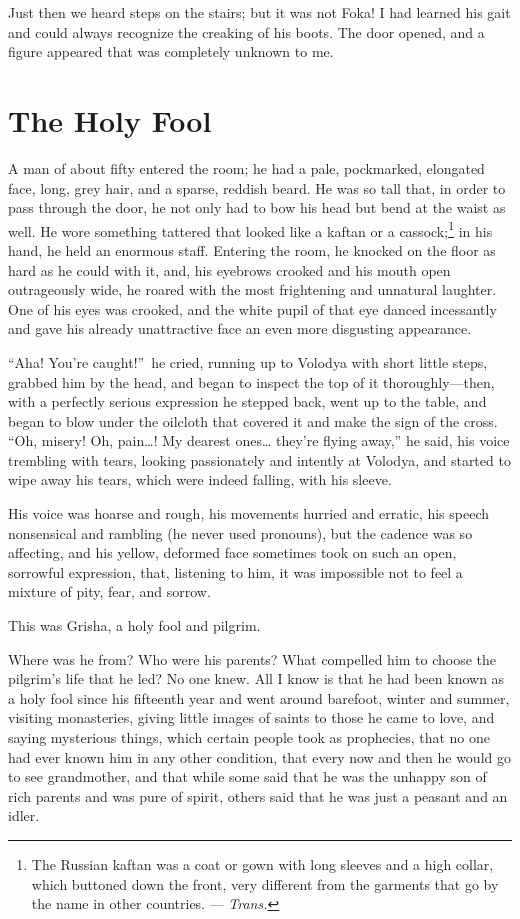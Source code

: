Just then we heard steps on the stairs; but it was not Foka! I had learned his gait and could always recognize the creaking of his boots. The door opened, and a figure appeared that was completely unknown to me.

\chapter{The Holy Fool} %

A man of about fifty entered the room; he had a pale, pockmarked, elongated face, long, grey hair, and a sparse, reddish beard. He was so tall that, in order to pass through the door, he not only had to bow his head but bend at the waist as well. He wore something tattered that looked like a kaftan or a cassock;\footnote{The Russian kaftan was a coat or gown with long sleeves and a high collar, which buttoned down the front, very different from the garments that go by the name in other countries. --- \textit{Trans.}} in his hand, he held an enormous staff. Entering the room, he knocked on the floor as hard as he could with it, and, his eyebrows crooked and his mouth open outrageously wide, he roared with the most frightening and unnatural laughter. One of his eyes was crooked, and the white pupil of that eye danced incessantly and gave his already unattractive face an even more disgusting appearance.

``Aha! You're caught!''~he cried, running up to Volodya with short little steps, grabbed him by the head, and began to inspect the top of it thoroughly---then, with a perfectly serious expression he stepped back, went up to the table, and began to blow under the oilcloth that covered it and make the sign of the cross. ``Oh, misery! Oh, pain\ldots{}! My dearest ones\ldots{} they're flying away,'' he said, his voice trembling with tears, looking passionately and intently at Volodya, and started to wipe away his tears, which were indeed falling, with his sleeve. %

His voice was hoarse and rough, his movements hurried and erratic, his speech nonsensical and rambling (he never used pronouns), but the cadence was so affecting, and his yellow, deformed face sometimes took on such an open, sorrowful expression, that, listening to him, it was impossible not to feel a mixture of pity, fear, and sorrow.

This was Grisha, a holy fool and pilgrim.

Where was he from? Who were his parents? What compelled him to choose the pilgrim's life that he led? No one knew. All I know is that he had been known as a holy fool since his fifteenth year and went around barefoot, winter and summer, visiting monasteries, giving little images of saints to those he came to love, and saying mysterious things, which certain people took as prophecies, that no one had ever known him in any other condition, that every now and then he would go to see grandmother, and that while some said that he was the unhappy son of rich parents and was pure of spirit, others said that he was just a peasant and an idler.

